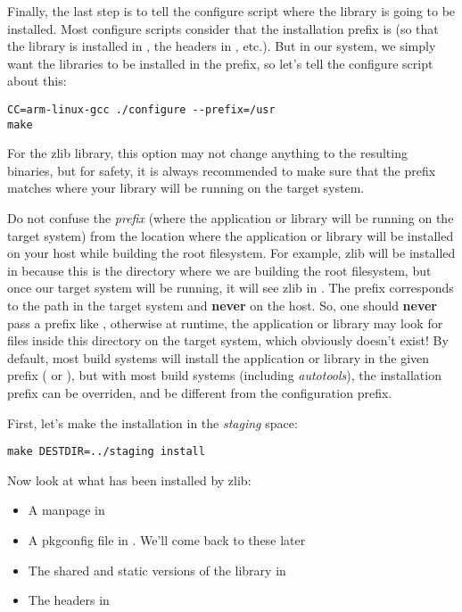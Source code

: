 Finally, the last step is to tell the configure script where the
library is going to be installed. Most configure scripts consider that
the installation prefix is  (so that the library is
installed in , the headers in
, etc.). But in our system, we simply want
the libraries to be installed in the  prefix, so let's tell
the configure script about this:

\begin{verbatim}
CC=arm-linux-gcc ./configure --prefix=/usr
make
\end{verbatim}

For the zlib library, this option may not change anything to the
resulting binaries, but for safety, it is always recommended to make
sure that the prefix matches where your library will be running on the
target system.

Do not confuse the {\em prefix} (where the application or library will
be running on the target system) from the location where the
application or library will be installed on your host while building
the root filesystem. For example, zlib will be installed in
 because
this is the directory where we are building the root filesystem, but
once our target system will be running, it will see zlib in
. The prefix corresponds to the path in the target
system and {\bf never} on the host. So, one should {\bf never} pass a
prefix like ,
otherwise at runtime, the application or library may look for files
inside this directory on the target system, which obviously doesn't
exist! By default, most build systems will install the application or
library in the given prefix ( or ), but
with most build systems (including {\em autotools}), the installation
prefix can be overriden, and be different from the configuration
prefix.

First, let's make the installation in the {\em staging} space:
\begin{verbatim}
make DESTDIR=../staging install
\end{verbatim}

Now look at what has been installed by zlib:
\begin{itemize}
\item A manpage in 
\item A pkgconfig file in . We'll come back to these
  later
\item The shared and static versions of the library in 
\item The headers in 
\end{itemize}

